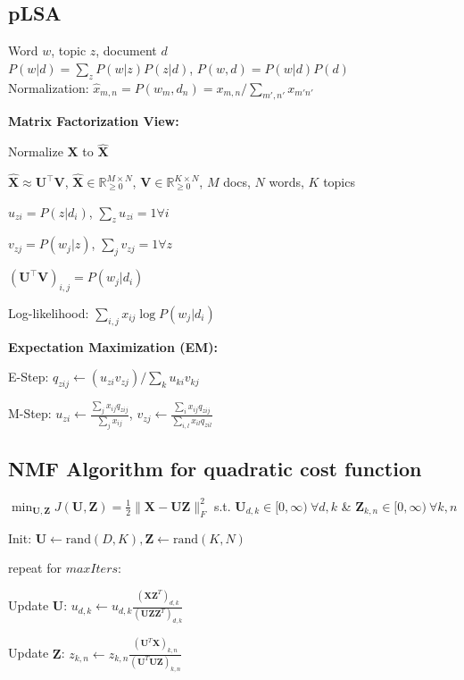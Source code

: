 \documentclass[a4paper, 11pt, landscape]{article}
\begin{document}
\begin{multicols*}{3}
\subsection{pLSA}
Word $w$, topic $z$, document $d$\\
$P(w|d) = \sum_{z}P(w|z)P(z|d)$, $P(w,d) = P(w|d)P(d)$\\
Normalization: $\hat{x}_{m,n} = P(w_m,d_n)=x_{m,n}/\sum_{m',n'}x_{m'n'}$

\textbf{Matrix Factorization View:}
\begin{inparaitem}[\color{red}\textbullet]
	\item Normalize $\mathbf{X}$ to $\hat{\mathbf{X}}$
	\item $\hat{\mathbf{X}} \approx \mathbf{U}^\top \mathbf{V}$, $\hat{\mathbf{X}} \in \mathbb{R}^{M \times N}_{\geq 0}$, $\mathbf{V} \in \mathbb{R}^{K\times N}_{\geq 0}$, $M$ docs, $N$ words, $K$ topics
	\item $u_{zi} = P(z|d_i)$, $\sum_{z}u_{zi} = 1 \forall i$
	\item $v_{zj} = P(w_j|z)$, $\sum_{j} v_{zj} = 1 \forall z$
	\item $(\mathbf{U}^\top \mathbf{V})_{i,j} = P(w_j|d_i)$
	\item Log-likelihood: $\sum_{i,j}x_{ij}\log P(w_j|d_i)$
\end{inparaitem}

\textbf{Expectation Maximization (EM):}
\begin{compactenum}
	\item E-Step: $q_{zij} \gets (u_{zi}v_{zj}) / \sum_{k}u_{ki}v_{kj}$
	\item M-Step: $u_{zi} \gets \frac{\sum_j x_{ij}q_{zij}}{\sum_jx_{ij}}$, $v_{zj} \gets \frac{\sum_i x_{ij}q_{zij}}{\sum_{i,l}x_{il}q_{zil}}$
\end{compactenum}

\subsection{NMF Algorithm for quadratic cost function}
$\min_{\mathbf{U}, \mathbf{Z}} J(\mathbf{U}, \mathbf{Z}) = \frac{1}{2} \|\mathbf{X} - \mathbf{U}\mathbf{Z}\|_F^2$ s.t. $\mathbf{U}_{d,k} \in [0, \infty)\ \forall d, k$ \&  $\mathbf{Z}_{k, n} \in [0, \infty)\ \forall k, n$
\begin{inparaenum}
	\item Init: $\mathbf{U} \gets \mathrm{rand}(D,K), \mathbf{Z} \gets \mathrm{rand}(K,N)$
	\item repeat for $\mathit{maxIters}$:
	\item Update $\mathbf{U}$: $u_{d,k} \gets u_{d,k} \frac{(\mathbf{X}\mathbf{Z}^T)_{d,k}}{(\mathbf{U}\mathbf{Z}\mathbf{Z}^T)_{d,k}}$
	\item Update $\mathbf{Z}$: $z_{k,n} \gets z_{k,n} \frac{(\mathbf{U}^T\mathbf{X})_{k,n}}{(\mathbf{U}^T\mathbf{U}\mathbf{Z})_{k,n}}$
\end{inparaenum}

\raggedcolumns
\end{multicols*}
\end{document}
